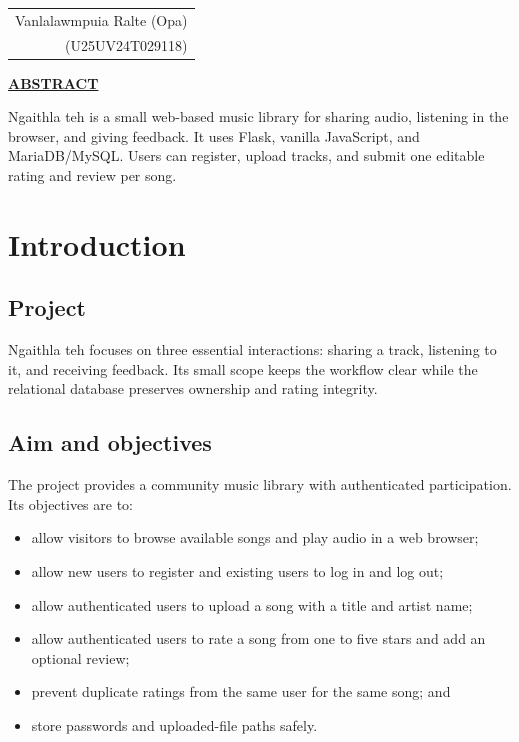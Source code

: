 \documentclass[12pt,a4paper]{article}
\newcommand{\chaptertitle}[1]{%
  \clearpage
  \section{#1}%
  \thispagestyle{chapterstart}%
}
\newcommand{\studentName}{Vanlalawmpuia Ralte (Opa)}
\newcommand{\studentUSN}{U25UV24T029118}
\newcommand{\projectname}{Ngaithla teh}
\begin{document}
\vspace{2.5cm}
\begin{flushright}
  \small\bfseries\itshape
  \begin{tabular}{r}
    \studentName \\
    (\studentUSN)
  \end{tabular}
\end{flushright}

\clearpage
\pagestyle{empty}
\begin{center}
  {\Large\bfseries\underline{ABSTRACT}\par}
\end{center}
\vspace{1cm}
\projectname{} is a small web-based music library for sharing audio, listening in the browser, and giving feedback. It uses Flask, vanilla JavaScript, and MariaDB/MySQL. Users can register, upload tracks, and submit one editable rating and review per song.

\clearpage
\pagestyle{fancy}
\tableofcontents
\clearpage

\chaptertitle{Introduction}

\subsection{Project}
\projectname{} focuses on three essential interactions: sharing a track, listening to it, and receiving feedback. Its small scope keeps the workflow clear while the relational database preserves ownership and rating integrity.

\subsection{Aim and objectives}
The project provides a community music library with authenticated participation. Its objectives are to:
\begin{itemize}[leftmargin=*]
  \item allow visitors to browse available songs and play audio in a web browser;
  \item allow new users to register and existing users to log in and log out;
  \item allow authenticated users to upload a song with a title and artist name;
  \item allow authenticated users to rate a song from one to five stars and add an optional review;
  \item prevent duplicate ratings from the same user for the same song; and
  \item store passwords and uploaded-file paths safely.
\end{itemize}
\end{document}
